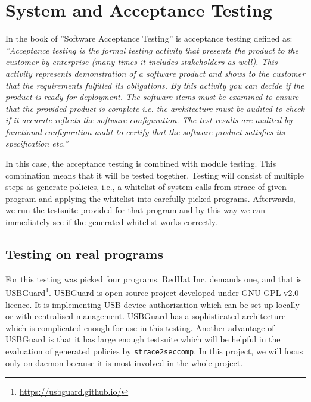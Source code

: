 
\section{System and Acceptance Testing}
\label{acceptance_testing}
In the book of ''Software Acceptance Testing'' is acceptance testing defined as:
\emph{''Acceptance testing is the formal testing activity that presents the
product to the customer by enterprise (many times it includes stakeholders as
well). This activity represents demonstration of a software product and shows to
the customer that the requirements fulfilled its obligations. By this activity
you can decide if the product is ready for deployment. The software items must
be examined to ensure that the provided product is complete i.e. the
architecture must be audited to check if it accurate reflects the software
configuration. The test results are audited by functional configuration audit to
certify that the software product satisfies its specification etc.''}
\cite{Schmidt2013335}

In this case, the acceptance testing is combined with module testing. This
combination means that it will be tested together. Testing will consist of
multiple steps as generate policies, i.e., a whitelist of system calls from
strace of given program and applying the whitelist into carefully picked
programs. Afterwards, we run the testsuite provided for that program and by this
way we can immediately see if the generated whitelist works correctly.

\subsection{Testing on real programs}
For this testing was picked four programs. RedHat Inc. demands one, and that is
USBGuard\footnote{\url{https://usbguard.github.io/}}. USBGuard is open source
project developed under GNU GPL v2.0 licence. It is implementing USB device
authorization which can be set up locally or with centralised
management\cite{usbguardCentralized}. USBGuard has a sophisticated architecture
which is complicated enough for use in this testing. Another advantage of
USBGuard is that it has large enough testsuite which will be helpful in the
evaluation of generated policies by \texttt{strace2seccomp}. In this project, we
will focus only on daemon because it is most involved in the whole project.


